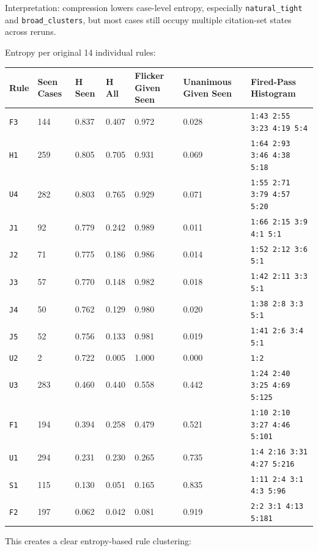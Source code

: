 \documentclass[11pt]{article}
\begin{document}
Interpretation: compression lowers case-level entropy, especially \texttt{natural\_tight} and \texttt{broad\_clusters}, but most cases still occupy multiple citation-set states across reruns.

Entropy per original 14 individual rules:

\begingroup
\small
\begin{longtable}{L{0.07\textwidth} R{0.09\textwidth} R{0.08\textwidth} R{0.08\textwidth} R{0.11\textwidth} R{0.12\textwidth} L{0.30\textwidth}}
\toprule
Rule & Seen Cases & H Seen & H All & Flicker Given Seen & Unanimous Given Seen & Fired-Pass Histogram \\
\midrule
\endhead
\texttt{F3} & 144 & 0.837 & 0.407 & 0.972 & 0.028 & \texttt{1:43 2:55 3:23 4:19 5:4} \\
\texttt{H1} & 259 & 0.805 & 0.705 & 0.931 & 0.069 & \texttt{1:64 2:93 3:46 4:38 5:18} \\
\texttt{U4} & 282 & 0.803 & 0.765 & 0.929 & 0.071 & \texttt{1:55 2:71 3:79 4:57 5:20} \\
\texttt{J1} & 92 & 0.779 & 0.242 & 0.989 & 0.011 & \texttt{1:66 2:15 3:9 4:1 5:1} \\
\texttt{J2} & 71 & 0.775 & 0.186 & 0.986 & 0.014 & \texttt{1:52 2:12 3:6 5:1} \\
\texttt{J3} & 57 & 0.770 & 0.148 & 0.982 & 0.018 & \texttt{1:42 2:11 3:3 5:1} \\
\texttt{J4} & 50 & 0.762 & 0.129 & 0.980 & 0.020 & \texttt{1:38 2:8 3:3 5:1} \\
\texttt{J5} & 52 & 0.756 & 0.133 & 0.981 & 0.019 & \texttt{1:41 2:6 3:4 5:1} \\
\texttt{U2} & 2 & 0.722 & 0.005 & 1.000 & 0.000 & \texttt{1:2} \\
\texttt{U3} & 283 & 0.460 & 0.440 & 0.558 & 0.442 & \texttt{1:24 2:40 3:25 4:69 5:125} \\
\texttt{F1} & 194 & 0.394 & 0.258 & 0.479 & 0.521 & \texttt{1:10 2:10 3:27 4:46 5:101} \\
\texttt{U1} & 294 & 0.231 & 0.230 & 0.265 & 0.735 & \texttt{1:4 2:16 3:31 4:27 5:216} \\
\texttt{S1} & 115 & 0.130 & 0.051 & 0.165 & 0.835 & \texttt{1:11 2:4 3:1 4:3 5:96} \\
\texttt{F2} & 197 & 0.062 & 0.042 & 0.081 & 0.919 & \texttt{2:2 3:1 4:13 5:181} \\
\bottomrule
\end{longtable}
\endgroup

This creates a clear entropy-based rule clustering:
\end{document}
